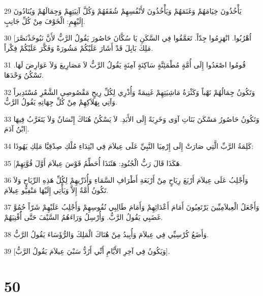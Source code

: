 \par 29 يَأْخُذُونَ خِيَامَهُمْ وَغَنَمَهُمْ وَيَأْخُذُونَ لأَنْفُسِهِمْ شُقَقَهُمْ وَكُلَّ آنِيَتِهِمْ وَجِمَالَهُمْ وَيُنَادُونَ إِلَيْهِمِ: الْخَوْفَ مِنْ كُلِّ جَانِبٍ.
\par 30 [اُهْرُبُوا. انْهَزِمُوا جِدّاً. تَعَمَّقُوا فِي السَّكَنِ يَا سُكَّانَ حَاصُورَ يَقُولُ الرَّبُّ لأَنَّ نَبُوخَذْنَصَّرَ مَلِكَ بَابِلَ قَدْ أَشَارَ عَلَيْكُمْ مَشُورَةً وَفَكَّرَ عَلَيْكُمْ فِكْراً.
\par 31 قُومُوا اصْعَدُوا إِلَى أُمَّةٍ مُطْمَئِنَّةٍ سَاكِنَةٍ آمِنَةٍ يَقُولُ الرَّبُّ لاَ مَصَارِيعَ وَلاَ عَوَارِضَ لَهَا. تَسْكُنُ وَحْدَهَا.
\par 32 وَتَكُونُ جِمَالُهُمْ نَهْباً وَكَثْرَةُ مَاشِيَتِهِمْ غَنِيمَةً وَأُذْرِي لِكُلِّ رِيحٍ مَقْصُوصِي الشَّعْرِ مُسْتَدِيراً وَآتِي بِهَلاَكِهِمْ مِنْ كُلِّ جِهَاتِهِ يَقُولُ الرَّبُّ.
\par 33 وَتَكُونُ حَاصُورُ مَسْكَنَ بَنَاتِ آوَى وَخَرِبَةً إِلَى الأَبَدِ. لاَ يَسْكُنُ هُنَاكَ إِنْسَانٌ وَلاَ يَتَغَرَّبُ فِيهَا ابْنُ آدَمَ].
\par 34 كَلِمَةُ الرَّبِّ الَّتِي صَارَتْ إِلَى إِرْمِيَا النَّبِيِّ عَلَى عِيلاَمَ فِي ابْتِدَاءِ مُلْكِ صِدْقِيَّا مَلِكِ يَهُوذَا:
\par 35 [هَكَذَا قَالَ رَبُّ الْجُنُودِ: هَئَنَذَا أُحَطِّمُ قَوْسَ عِيلاَمَ أَوَّلَ قُوَّتِهِمْ.
\par 36 وَأَجْلِبُ عَلَى عِيلاَمَ أَرْبَعَ رِيَاحٍ مِنْ أَرْبَعَةِ أَطْرَافِ السَّمَاءِ وَأُذَرِّيهِمْ لِكُلِّ هَذِهِ الرِّيَاحِ وَلاَ تَكُونُ أُمَّةٌ إِلاَّ وَيَأْتِي إِلَيْهَا مَنْفِيُّو عِيلاَمَ.
\par 37 وَأَجْعَلُ الْعِيلاَمِيِّينَ يَرْتَعِبُونَ أَمَامَ أَعْدَائِهِمْ وَأَمَامَ طَالِبِي نُفُوسِهِمْ وَأَجْلِبُ عَلَيْهِمْ شَرّاً حُمُوَّ غَضَبِي يَقُولُ الرَّبُّ. وَأُرْسِلُ وَرَاءَهُمُ السَّيْفَ حَتَّى أَُفْنِيَهُمْ.
\par 38 وَأَضَعُ كُرْسِيِّي فِي عِيلاَمَ وَأُبِيدُ مِنْ هُنَاكَ الْمَلِكَ وَالرُّؤَسَاءَ يَقُولُ الرَّبُّ.
\par 39 [وَيَكُونُ فِي آخِرِ الأَيَّامِ أَنِّي أَرُدُّ سَبْيَ عِيلاَمَ يَقُولُ الرَّبُّ].

\chapter{50}

